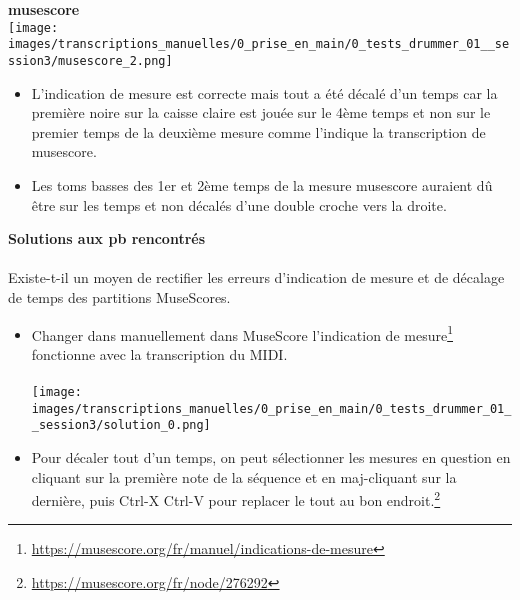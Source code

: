 \documentclass{report}
\begin{document}
	\textbf{musescore}\\
	\texttt{[image: images/transcriptions\_manuelles/0\_prise\_en\_main/0\_tests\_drummer\_01\_\_session3/musescore\_2.png]} \\
	\begin{itemize}
		\item L’indication de mesure est correcte mais tout a été décalé d’un temps car la première noire sur la caisse claire est jouée sur le 4ème temps et non sur le premier temps de la deuxième mesure comme l’indique la transcription de musescore.
		\item Les toms basses des 1er et 2ème temps de la mesure musescore auraient dû être sur les temps et non décalés d’une double croche vers la droite.\\
	\end{itemize}
	\textbf{Solutions aux pb rencontrés}\\\\
	Existe-t-il un moyen de rectifier les erreurs d’indication de mesure et de décalage de temps des partitions MuseScores.\\
	\begin{itemize}
		\item Changer dans manuellement dans MuseScore l’indication de mesure\footnote{\url{https://musescore.org/fr/manuel/indications-de-mesure}} fonctionne avec la transcription du MIDI. \\\\ \texttt{[image: images/transcriptions\_manuelles/0\_prise\_en\_main/0\_tests\_drummer\_01\_\_session3/solution\_0.png]} \\
		\item Pour décaler tout d’un temps, on peut sélectionner les mesures en question en cliquant sur la première note de la séquence et en maj-cliquant sur la dernière, puis Ctrl-X Ctrl-V pour replacer le tout au bon endroit.\footnote{\url{https://musescore.org/fr/node/276292}}\\
	\end{itemize}
	
\end{document}
